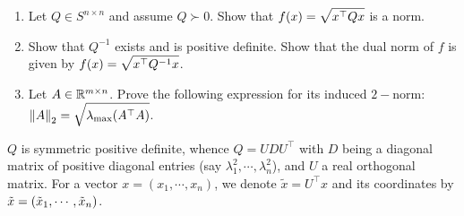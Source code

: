 \newpage
\pb
\begin{enumerate}[leftmargin=*]
\item Let $Q\in S^{n\times n}$ and assume $Q\succ 0$. Show that $\displaystyle f(x) = \sqrt{x^\top Qx}$ is a norm.
\item Show that $Q^{-1}$ exists and is positive definite. Show that the dual norm of $f$ is given by $\displaystyle f(x) = \sqrt{x^\top Q^{-1}x}$.
\item Let $A \in\mathbb{R}^{m\times n}$. Prove the following expression for its induced $2-$norm: $\displaystyle\left\lVert A \right\rVert_{2} = \sqrt{\lambda_{\max}(A^\top A)}$.
\end{enumerate}

\soln
$Q$ is symmetric positive definite, whence $Q=UDU^\top$ with $D$ being a diagonal matrix of positive diagonal entries (say $\lambda_1^2, \cdots,\lambda_n^2$), and $U$ a real orthogonal matrix. For a vector $x = (x_1,\cdots,x_n)$, we denote $\tilde x=U^\top x$ and its coordinates by ${\tilde{x}}=({\tilde{x}}_1,\cdots,{\tilde{x}}_n)$.

